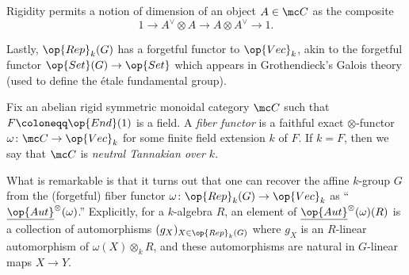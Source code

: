 \documentclass{article}
\begin{document}
\begin{remark}
	Rigidity permits a notion of dimension of an object $A\in\mc C$ as the composite
	\[1\to A^\lor\otimes A\to A\otimes A^\lor\to1.\]
\end{remark}
Lastly, $\op{Rep}_k(G)$ has a forgetful functor to $\op{Vec}_k$, akin to the forgetful functor $\op{Set}(G)\to\op{Set}$ which appears in Grothendieck's Galois theory (used to define the \'etale fundamental group).
\begin{definition}
	Fix an abelian rigid symmetric monoidal category $\mc C$ such that $F\coloneqq\op{End}(1)$ is a field. A \textit{fiber functor} is a faithful exact $\otimes$-functor $\omega\colon\mc C\to\op{Vec}_k$ for some finite field extension $k$ of $F$. If $k=F$, then we say that $\mc C$ is \textit{neutral Tannakian over $k$}.
\end{definition}
What is remarkable is that it turns out that one can recover the affine $k$-group $G$ from the (forgetful) fiber functor $\omega\colon\op{Rep}_k(G)\to\op{Vec}_k$ as ``$\underline{\op{Aut}}^\otimes(\omega)$.'' Explicitly, for a $k$-algebra $R$, an element of $\underline{\op{Aut}}^\otimes(\omega)(R)$ is a collection of automorphisms $(g_X)_{X\in\op{Rep}_k(G)}$ where $g_X$ is an $R$-linear automorphism of $\omega(X)\otimes_kR$, and these automorphisms are natural in $G$-linear maps $X\to Y$.
\end{document}
